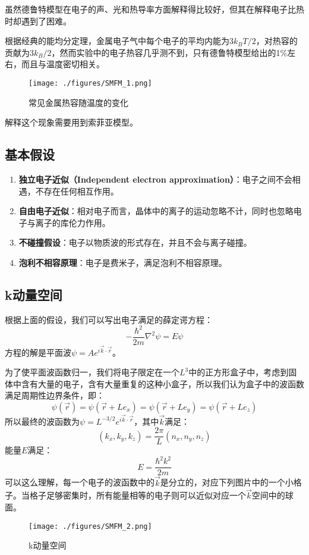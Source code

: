 
\begin{issues}
\issueDraft
\end{issues}

虽然德鲁特模型在电子的声、光和热导率方面解释得比较好，但其在解释电子比热时却遇到了困难。

根据经典的能均分定理，金属电子气中每个电子的平均内能为$3k_BT/2$，对热容的贡献为$3k_B/2$，然而实验中的电子热容几乎测不到，只有德鲁特模型给出的1\%左右，而且与温度密切相关。
\begin{figure}[ht]
\centering
\texttt{[image: ./figures/SMFM\_1.png]}
\caption{常见金属热容随温度的变化} \label{SMFM_fig1}
\end{figure}
解释这个现象需要用到索菲亚模型。
\subsection{基本假设}
\begin{enumerate}
\item \textbf{独立电子近似（Independent electron approximation）}：电子之间不会相遇，不存在任何相互作用。
\item \textbf{自由电子近似}：相对电子而言，晶体中的离子的运动忽略不计，同时也忽略电子与离子的库伦力作用。
\item \textbf{不碰撞假设}：电子以物质波的形式存在，并且不会与离子碰撞。
\item \textbf{泡利不相容原理}：电子是费米子，满足泡利不相容原理。
\end{enumerate}
\subsection{k动量空间}
根据上面的假设，我们可以写出电子满足的薛定谔方程：
\begin{equation}
-\frac{\hbar^2}{2m}\nabla^2\psi=E\psi
\end{equation}
方程的解是平面波$\psi=Ae^{i\vec{k}\cdot \vec{r}}$。

为了使平面波函数归一，我们将电子限定在一个$L^3$中的正方形盒子中，考虑到固体中含有大量的电子，含有大量重复的这种小盒子，所以我们认为盒子中的波函数满足周期性边界条件，即：
\begin{equation}
\psi(\vec{r})=\psi(\vec{r}+Le_x)=\psi(\vec{r}+Le_y)=\psi(\vec{r}+Le_z)
\end{equation}
所以最终的波函数为$\psi=L^{-3/2}e^{i\vec{k}\cdot \vec{r}}$，其中$\vec{k}$满足：
\begin{equation}
\left (k_x, k_y, k_z\right )=\frac{2\pi}{L}\left(n_x, n_y, n_z\right )
\end{equation}
能量$E$满足：
\begin{equation}
E=\frac{\hbar ^2 k^2}{2m}
\end{equation}
可以这么理解，每一个电子的波函数中的$\vec{k}$是分立的，对应下列图片中的一个小格子。当格子足够密集时，所有能量相等的电子则可以近似对应一个$\vec{k}$空间中的球面。
\begin{figure}[ht]
\centering
\texttt{[image: ./figures/SMFM\_2.png]}
\caption{k动量空间} \label{SMFM_fig2}
\end{figure}
